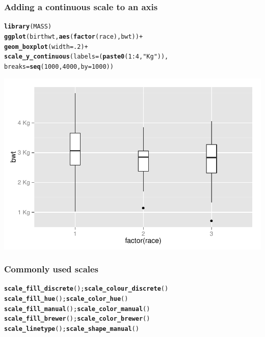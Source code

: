 \documentclass{beamer}\usepackage[]{graphicx}\usepackage[]{color}
\makeatletter
\newcommand{\hlnum}[1]{\textcolor[rgb]{0.686,0.059,0.569}{#1}}%
\newcommand{\hlstr}[1]{\textcolor[rgb]{0.192,0.494,0.8}{#1}}%
\newcommand{\hlopt}[1]{\textcolor[rgb]{0,0,0}{#1}}%
\newcommand{\hlstd}[1]{\textcolor[rgb]{0.345,0.345,0.345}{#1}}%
\newcommand{\hlkwc}[1]{\textcolor[rgb]{0.333,0.667,0.333}{#1}}%
\newcommand{\hlkwd}[1]{\textcolor[rgb]{0.737,0.353,0.396}{\textbf{#1}}}%
\newenvironment{kframe}{%
 \def\at@end@of@kframe{}%
 \ifinner\ifhmode%
  \def\at@end@of@kframe{\end{minipage}}%
  \begin{minipage}{\columnwidth}%
 \fi\fi%
 \def\FrameCommand##1{\hskip\@totalleftmargin \hskip-\fboxsep
 \colorbox{shadecolor}{##1}\hskip-\fboxsep
     \hskip-\linewidth \hskip-\@totalleftmargin \hskip\columnwidth}%
 \MakeFramed {\advance\hsize-\width
   \@totalleftmargin\z@ \linewidth\hsize
   \@setminipage}}%
 {\par\unskip\endMakeFramed%
 \at@end@of@kframe}
\newenvironment{knitrout}{}{} %
\makeatother
\begin{document}

\begin{frame}[fragile]
\frametitle{Adding a continuous scale to an axis}
\begin{knitrout}\footnotesize
{}\color{fgcolor}\begin{kframe}
\begin{alltt}
\hlkwd{library}\hlstd{(MASS)}
\hlkwd{ggplot}\hlstd{(birthwt,} \hlkwd{aes}\hlstd{(}\hlkwd{factor}\hlstd{(race), bwt))} \hlopt{+}
\hlkwd{geom_boxplot}\hlstd{(}\hlkwc{width} \hlstd{=} \hlnum{.2}\hlstd{)} \hlopt{+}
\hlkwd{scale_y_continuous}\hlstd{(}\hlkwc{labels} \hlstd{= (}\hlkwd{paste0}\hlstd{(}\hlnum{1}\hlopt{:}\hlnum{4}\hlstd{,} \hlstr{" Kg"}\hlstd{)),}
\hlkwc{breaks} \hlstd{=} \hlkwd{seq}\hlstd{(}\hlnum{1000}\hlstd{,} \hlnum{4000}\hlstd{,} \hlkwc{by} \hlstd{=} \hlnum{1000}\hlstd{))}
\end{alltt}
\end{kframe}

{\centering \includegraphics[width=.75\linewidth]{figure/boxplots3} 

}



\end{knitrout}

\end{frame}


\begin{frame}[fragile]
\frametitle{Commonly used scales}
\begin{knitrout}\footnotesize
{}\color{fgcolor}\begin{kframe}
\begin{alltt}
\hlkwd{scale_fill_discrete}\hlstd{();} \hlkwd{scale_colour_discrete}\hlstd{()}
\hlkwd{scale_fill_hue}\hlstd{();} \hlkwd{scale_color_hue}\hlstd{()}
\hlkwd{scale_fill_manual}\hlstd{();}  \hlkwd{scale_color_manual}\hlstd{()}
\hlkwd{scale_fill_brewer}\hlstd{();} \hlkwd{scale_color_brewer}\hlstd{()}
\hlkwd{scale_linetype}\hlstd{();} \hlkwd{scale_shape_manual}\hlstd{()}
\end{alltt}
\end{kframe}
\end{knitrout}

\end{frame}
\end{document}
